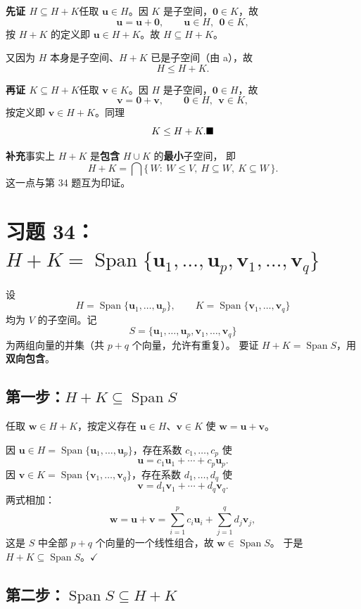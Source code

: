 \documentclass[11pt]{ctexart}
\newcommand{\Span}{\operatorname{Span}}
\newcommand{\0}{\mathbf{0}}
\begin{document}
\textbf{先证 $H\subseteq H+K$}\quad 任取 $\mathbf u\in H$。因 $K$ 是子空间，$\0\in K$，故
\[
\mathbf u=\mathbf u+\0,\qquad \mathbf u\in H,\ \ \0\in K ,
\]
按 $H+K$ 的定义即 $\mathbf u\in H+K$。故 $H\subseteq H+K$。

又因为 $H$ 本身是子空间、$H+K$ 已是子空间（由 a），故
\[
H\le H+K .
\]

\textbf{再证 $K\subseteq H+K$}\quad 任取 $\mathbf v\in K$。因 $H$ 是子空间，$\0\in H$，故
\[
\mathbf v=\0+\mathbf v,\qquad \0\in H,\ \ \mathbf v\in K ,
\]
按定义即 $\mathbf v\in H+K$。同理
\[
K\le H+K . \hfill \blacksquare
\]

\smallskip
\textbf{补充}\quad 事实上 $H+K$ 是\textbf{包含} $H\cup K$ 的\textbf{最小}子空间，
即
\[
H+K=\bigcap\{\,W:\ W\le V,\ H\subseteq W,\ K\subseteq W\,\}.
\]
这一点与第 34 题互为印证。

\section*{习题 34：$H+K=\Span\{\mathbf u_1,\dots,\mathbf u_p,\mathbf v_1,\dots,\mathbf v_q\}$}

\noindent 设
\[
H=\Span\{\mathbf u_1,\dots,\mathbf u_p\},\qquad K=\Span\{\mathbf v_1,\dots,\mathbf v_q\}
\]
均为 $V$ 的子空间。记
\[
S=\{\mathbf u_1,\dots,\mathbf u_p,\mathbf v_1,\dots,\mathbf v_q\}
\]
为两组向量的并集（共 $p+q$ 个向量，允许有重复）。
要证 $H+K=\Span S$，用\textbf{双向包含}。

\subsection*{第一步：$H+K\subseteq\Span S$}

任取 $\mathbf w\in H+K$，按定义存在 $\mathbf u\in H$、$\mathbf v\in K$ 使 $\mathbf w=\mathbf u+\mathbf v$。

因 $\mathbf u\in H=\Span\{\mathbf u_1,\dots,\mathbf u_p\}$，存在系数 $c_1,\dots,c_p$ 使
\[
\mathbf u=c_1\mathbf u_1+\cdots+c_p\mathbf u_p .
\]
因 $\mathbf v\in K=\Span\{\mathbf v_1,\dots,\mathbf v_q\}$，存在系数 $d_1,\dots,d_q$ 使
\[
\mathbf v=d_1\mathbf v_1+\cdots+d_q\mathbf v_q .
\]
两式相加：
\[
\mathbf w=\mathbf u+\mathbf v
=\sum_{i=1}^{p}c_i\mathbf u_i+\sum_{j=1}^{q}d_j\mathbf v_j ,
\]
这是 $S$ 中全部 $p+q$ 个向量的一个线性组合，故 $\mathbf w\in\Span S$。
于是 $H+K\subseteq\Span S$。\hfill$\checkmark$

\subsection*{第二步：$\Span S\subseteq H+K$}
\end{document}
